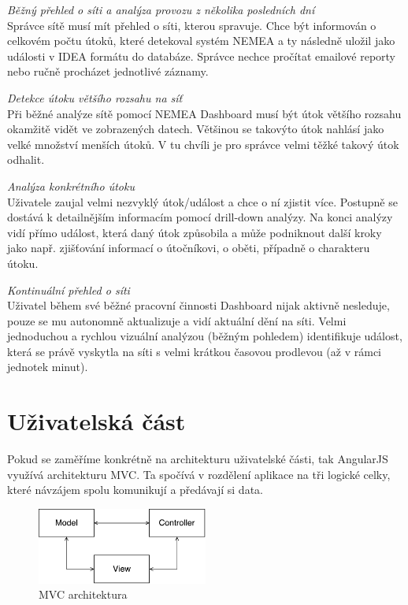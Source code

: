 \begin{description}
    \item \textit{Běžný přehled o síti a analýza provozu z několika posledních dní} \\
        Správce sítě musí mít přehled o síti, kterou spravuje. Chce být informován o celkovém počtu útoků, které detekoval systém NEMEA a ty následně uložil jako události v IDEA formátu do databáze. Správce nechce pročítat emailové reporty nebo ručně procházet jednotlivé záznamy.
    \item \textit{Detekce útoku většího rozsahu na síť} \\
        Při běžné analýze sítě pomocí NEMEA Dashboard musí být útok většího rozsahu okamžitě vidět ve zobrazených datech. Většinou se takovýto útok nahlásí jako velké množství menších útoků. V tu chvíli je pro správce velmi těžké takový útok odhalit.
    \item \textit{Analýza konkrétního útoku} \\
        Uživatele zaujal velmi nezvyklý útok/událost a chce o ní zjistit více. Postupně se dostává k detailnějším informacím pomocí drill-down analýzy. Na konci analýzy vidí přímo událost, která daný útok způsobila a může podniknout další kroky jako např. zjišťování informací o útočníkovi, o oběti, případně o charakteru útoku.
    \item \textit{Kontinuální přehled o síti} \\
        Uživatel během své běžné pracovní činnosti Dashboard nijak aktivně nesleduje, pouze se mu autonomně aktualizuje a vidí aktuální dění na síti. Velmi jednoduchou a rychlou vizuální analýzou (běžným pohledem) identifikuje událost, která se právě vyskytla na síti s velmi krátkou časovou prodlevou (až v rámci jednotek minut).
        
\end{description}


\section{Uživatelská část}
\label{sec:mvc}
Pokud se zaměříme konkrétně na architekturu uživatelské části, tak AngularJS využívá architekturu MVC. Ta spočívá v rozdělení aplikace na tři logické celky, které návzájem spolu komunikují a předávají si data.

\begin{figure}[h]
    \centering
    \includegraphics[width=0.5\textwidth]{fig/mvc.pdf}
    \caption{MVC architektura} \label{fig:mvc}
\end{figure}

